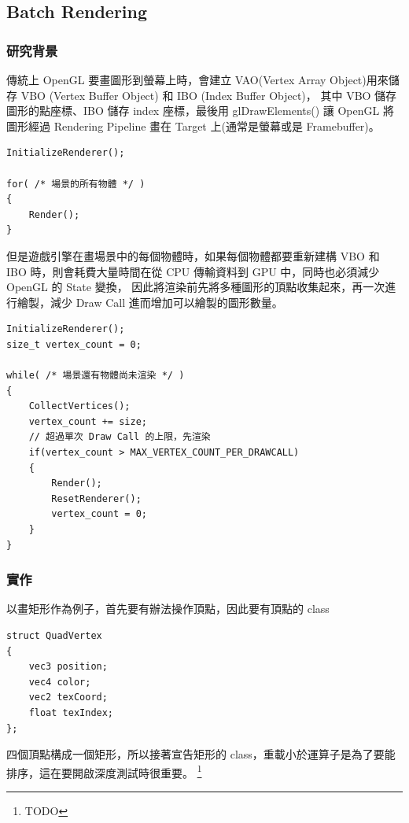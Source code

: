 \subsection{Batch Rendering} %
\label{sub:Batch Rendering}

\subsubsection{研究背景}

傳統上 OpenGL 要畫圖形到螢幕上時，會建立 VAO(Vertex Array Object)用來儲存 VBO (Vertex Buffer Object) 和 IBO (Index Buffer Object)，
其中 VBO 儲存圖形的點座標、IBO 儲存 index 座標，最後用 glDrawElements() 讓 OpenGL 將圖形經過 Rendering Pipeline 畫在 Target 上(通常是螢幕或是 Framebuffer)。

\begin{lstlisting}
InitializeRenderer();

for( /* 場景的所有物體 */ )
{
    Render();
}
\end{lstlisting}

但是遊戲引擎在畫場景中的每個物體時，如果每個物體都要重新建構 VBO 和 IBO 時，則會耗費大量時間在從 CPU 傳輸資料到 GPU 中，同時也必須減少 OpenGL 的 State 變換，
因此將渲染前先將多種圖形的頂點收集起來，再一次進行繪製，減少 Draw Call 進而增加可以繪製的圖形數量。

\begin{lstlisting}
InitializeRenderer();
size_t vertex_count = 0;

while( /* 場景還有物體尚未渲染 */ )
{
    CollectVertices();
    vertex_count += size;
    // 超過單次 Draw Call 的上限，先渲染
    if(vertex_count > MAX_VERTEX_COUNT_PER_DRAWCALL)
    {
        Render();
        ResetRenderer();
        vertex_count = 0;
    }
}
\end{lstlisting}

\subsubsection{實作}

以畫矩形作為例子，首先要有辦法操作頂點，因此要有頂點的 class

\begin{lstlisting}
struct QuadVertex
{
    vec3 position;
    vec4 color;
    vec2 texCoord;
    float texIndex;
};
\end{lstlisting}

四個頂點構成一個矩形，所以接著宣告矩形的 class，重載小於運算子是為了要能排序，這在要開啟深度測試時很重要。 \footnote{TODO}


